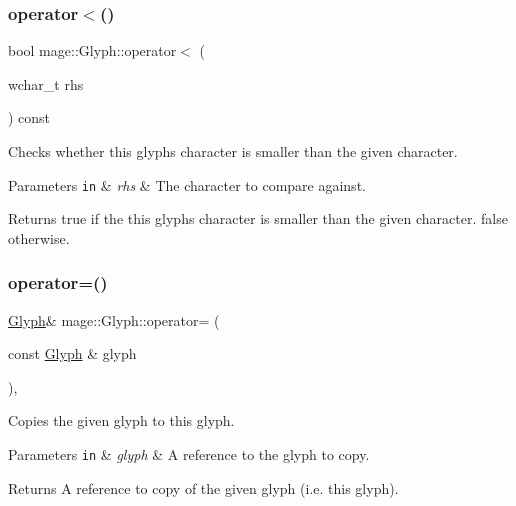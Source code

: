 \subsubsection{\texorpdfstring{operator$<$()}{operator<()}\hspace{0.1cm}{\footnotesize\ttfamily [2/2]}}
{\footnotesize\ttfamily bool mage\+::\+Glyph\+::operator$<$ (\begin{DoxyParamCaption}\item[{wchar\+\_\+t}]{rhs }\end{DoxyParamCaption}) const\hspace{0.3cm}{\ttfamily [noexcept]}}

Checks whether this glyph\textquotesingle{}s character is smaller than the given character.


\begin{DoxyParams}[1]{Parameters}
\mbox{\tt in}  & {\em rhs} & The character to compare against. \\
\hline
\end{DoxyParams}
\begin{DoxyReturn}{Returns}
{\ttfamily true} if the this glyph\textquotesingle{}s character is smaller than the given character. {\ttfamily false} otherwise. 
\end{DoxyReturn}
\hypertarget{structmage_1_1_glyph_a4cc57bb9e8ba26d625b75e6557415f8d}{}\label{structmage_1_1_glyph_a4cc57bb9e8ba26d625b75e6557415f8d} 
\subsubsection{\texorpdfstring{operator=()}{operator=()}\hspace{0.1cm}{\footnotesize\ttfamily [1/2]}}
{\footnotesize\ttfamily \hyperlink{structmage_1_1_glyph}{Glyph}\& mage\+::\+Glyph\+::operator= (\begin{DoxyParamCaption}\item[{const \hyperlink{structmage_1_1_glyph}{Glyph} \&}]{glyph }\end{DoxyParamCaption})\hspace{0.3cm}{\ttfamily [default]}, {\ttfamily [noexcept]}}

Copies the given glyph to this glyph.


\begin{DoxyParams}[1]{Parameters}
\mbox{\tt in}  & {\em glyph} & A reference to the glyph to copy. \\
\hline
\end{DoxyParams}
\begin{DoxyReturn}{Returns}
A reference to copy of the given glyph (i.\+e. this glyph). 
\end{DoxyReturn}
\hypertarget{structmage_1_1_glyph_a7562e4fbcafb0633ec2c6db5b5160670}{}\label{structmage_1_1_glyph_a7562e4fbcafb0633ec2c6db5b5160670} 
